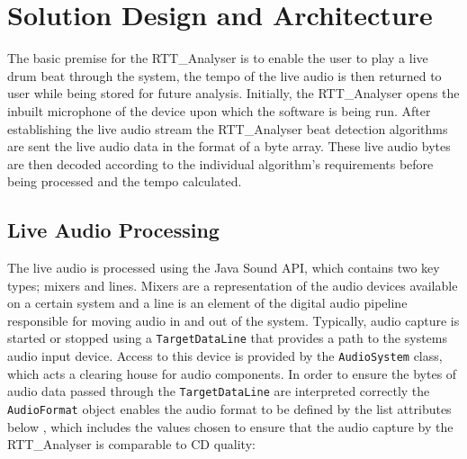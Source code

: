 \documentclass[a4paper, 11pt]{article}
\begin{document}
\maketitle{} \section{Solution Design and Architecture}
The basic premise for the RTT\_Analyser is to enable the user to play a live drum beat through the system, the tempo of the live audio is then returned to user while being stored for future analysis. Initially, the RTT\_Analyser opens the inbuilt microphone of the device upon which the software is being run. After establishing the live audio stream the RTT\_Analyser beat detection algorithms are sent the live audio data in the format of a byte array. These live audio bytes are then decoded according to the individual algorithm's requirements before being processed and the tempo calculated.

\subsection{Live Audio Processing}
\label{sec: liveaudio}
The live audio is processed using the Java Sound API, which contains two key types; mixers and lines. Mixers are a representation of the audio devices available on a certain system and a line is an element of the digital audio pipeline responsible for moving audio in and out of the system. Typically, audio capture is started or stopped using a \texttt{TargetDataLine} that provides a path to the systems audio input device. Access to this device is provided by the \texttt{AudioSystem} class, which acts a clearing house for audio components. In order to ensure the bytes of audio data passed through the \texttt{TargetDataLine} are interpreted correctly the \texttt{AudioFormat} object enables the audio format to be defined by the list attributes below \cite{javasound}, which includes the values chosen to ensure that the audio capture by the RTT\_Analyser is comparable to CD quality:
\end{document}
